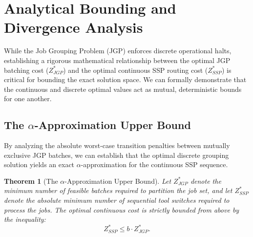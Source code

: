\documentclass[11pt, a4paper]{book}
\newtheorem{theorem}{Theorem}[chapter]
\begin{document}
	\section{Analytical Bounding and Divergence Analysis}
	
	While the Job Grouping Problem (JGP) enforces discrete operational halts, establishing a rigorous mathematical relationship between the optimal JGP batching cost ($Z_{JGP}^*$) and the optimal continuous SSP routing cost ($Z_{SSP}^*$) is critical for bounding the exact solution space. We can formally demonstrate that the continuous and discrete optimal values act as mutual, deterministic bounds for one another.
	
	\subsection{The $\alpha$-Approximation Upper Bound}
	
	By analyzing the absolute worst-case transition penalties between mutually exclusive JGP batches, we can establish that the optimal discrete grouping solution yields an exact $\alpha$-approximation for the continuous SSP sequence.
	
	\begin{theorem}[The $\alpha$-Approximation Upper Bound]
		Let $Z_{JGP}^*$ denote the minimum number of feasible batches required to partition the job set, and let $Z_{SSP}^*$ denote the absolute minimum number of sequential tool switches required to process the jobs. The optimal continuous cost is strictly bounded from above by the inequality:
		\begin{equation}
			Z_{SSP}^* \le b \cdot Z_{JGP}^*.
		\end{equation}
	\end{theorem}
	
\end{document}
